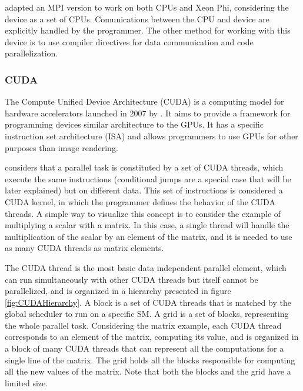 \intel adapted an MPI version to work on both CPUs and Xeon Phi, considering the device as a set of CPUs. Comunications between the CPU and device are explicitly handled by the programmer. The other method for working with this device is to use compiler directives for data communication and code parallelization.

\subsubsection*{CUDA}
\label{CUDA}

The Compute Unified Device Architecture (CUDA) is a computing model for hardware accelerators launched in 2007 by \nvidia. It aims to provide a framework for programming devices similar architecture to the \nvidia GPUs. It has a specific instruction set architecture (ISA) and allows programmers to use GPUs for other purposes than image rendering.

\nvidia considers that a parallel task is constituted by a set of CUDA threads, which execute the same instructions (conditional jumps are a special case that will be later explained) but on different data. This set of instructions is considered a CUDA kernel, in which the programmer defines the behavior of the CUDA threads. A simple way to visualize this concept is to consider the example of multiplying a scalar with a matrix. In this case, a single thread will handle the multiplication of the scalar by an element of the matrix, and it is needed to use as many CUDA threads as matrix elements.

The CUDA thread is the most basic data independent parallel element, which can run simultaneously with other CUDA threads but itself cannot be parallelized, and is organized in a hierarchy presented in figure \ref{fig:CUDAHierarchy}. A block is a set of CUDA threads that is matched by the global scheduler to run on a specific SM. A grid is a set of blocks, representing the whole parallel task. Considering the matrix example, each CUDA thread corresponds to an element of the matrix, computing its value, and is organized in a block of many CUDA threads that can represent all the computations for a single line of the matrix. The grid holds all the blocks responsible for computing all the new values of the matrix. Note that both the blocks and the grid have a limited size.

